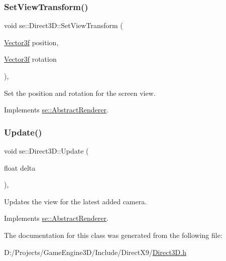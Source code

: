 \subsubsection{\texorpdfstring{Set\+View\+Transform()}{SetViewTransform()}}
{\footnotesize\ttfamily void se\+::\+Direct3\+D\+::\+Set\+View\+Transform (\begin{DoxyParamCaption}\item[{\mbox{\hyperlink{namespacese_a12e07512d95e2fdebdaf74a5ea2cf5f6}{Vector3f}}}]{position,  }\item[{\mbox{\hyperlink{namespacese_a12e07512d95e2fdebdaf74a5ea2cf5f6}{Vector3f}}}]{rotation }\end{DoxyParamCaption})\hspace{0.3cm}{\ttfamily [override]}, {\ttfamily [virtual]}}

Set the position and rotation for the screen view. 

Implements \mbox{\hyperlink{classse_1_1_abstract_renderer_a710e67232e977fbb3b74f79640e0b62e}{se\+::\+Abstract\+Renderer}}.

\mbox{\label{classse_1_1_direct3_d_a39934c194406f108a992d82a4d265381}} 
\subsubsection{\texorpdfstring{Update()}{Update()}}
{\footnotesize\ttfamily void se\+::\+Direct3\+D\+::\+Update (\begin{DoxyParamCaption}\item[{float}]{delta }\end{DoxyParamCaption})\hspace{0.3cm}{\ttfamily [override]}, {\ttfamily [virtual]}}

Updates the view for the latest added camera. 

Implements \mbox{\hyperlink{classse_1_1_abstract_renderer_aae49e7417663d6a5aca34a2bb37b4b28}{se\+::\+Abstract\+Renderer}}.



The documentation for this class was generated from the following file\+:\begin{DoxyCompactItemize}
\item 
D\+:/\+Projects/\+Game\+Engine3\+D/\+Include/\+Direct\+X9/\mbox{\hyperlink{_direct3_d_8h}{Direct3\+D.\+h}}\end{DoxyCompactItemize}
